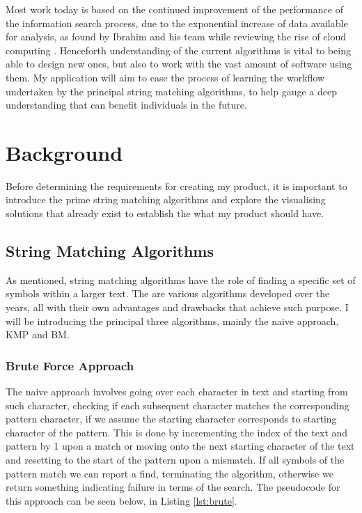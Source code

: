 \documentclass{l4proj}
\begin{document}
Most work today is based on the continued improvement of the performance of the information search process, due to the exponential increase of data available for analysis, as found by Ibrahim and his team while reviewing the rise of cloud computing \cite{HASHEM201598}. Henceforth understanding of the current algorithms is vital to being able to design new ones, but also to work with the vast amount of software using them. My application will aim to ease the process of learning the workflow undertaken by the principal string matching algorithms, to help gauge a deep understanding that can benefit individuals in the future.

\chapter{Background}
Before determining the requirements for creating my product, it is important to introduce the prime string matching algorithms  and explore the visualising solutions that already exist  to establish the what my product should have.

\section{String Matching Algorithms}

As mentioned, string matching algorithms have the role of finding a specific set of symbols within a larger text. The are various algorithms developed over the years, all with their own advantages and drawbacks that achieve such purpose. I will be introducing the principal three algorithms, mainly the naive approach, KMP and BM.

\label{alg:brute-force}
\subsection{Brute Force Approach}
The naive approach involves going over each character in text and starting from such character, checking if each subsequent character matches the corresponding pattern character, if we assume the starting character corresponds to starting character of the pattern. This is done by incrementing the index of the text and pattern by 1 upon a match or moving onto the next starting character of the text and resetting to the start of the pattern upon a mismatch. If all symbols of the pattern match we can report a find, terminating the algorithm, otherwise we return something indicating failure in terms of the search. The pseudocode for this approach can be seen below, in Listing \ref{lst:brute}.
\end{document}
